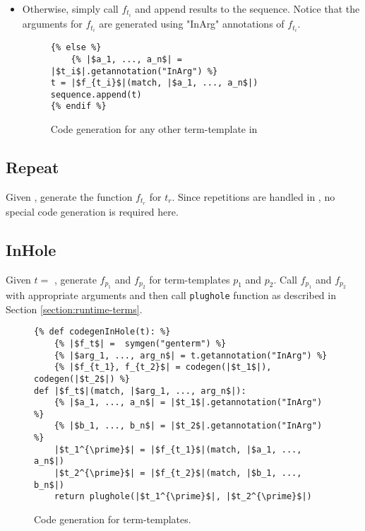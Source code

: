 \begin{itemize}
\item Otherwise, simply call $f_{t_i}$ and append results to the sequence. Notice that the arguments for $f_{t_i}$ are generated using "InArg" annotations of $f_{t_i}$.

\begin{figure}
\begin{verbatim}
{% else %}
	{% |$a_1, ..., a_n$| = |$t_i$|.getannotation("InArg") %}
t = |$f_{t_i}$|(match, |$a_1, ..., a_n$|)
sequence.append(t)
{% endif %}
\end{verbatim}
\caption{Code generation for any other term-template in \TermSequenceNoArg}
\label{codegen-term-sequence-anyother}
\end{figure}
\end{itemize}

\subsection{Repeat}
Given \TermRepeat, generate the function $f_{t_r}$ for $t_r$. Since repetitions are handled in \TermSequenceNoArg, no special code generation is required here.

\subsection{InHole}
Given $t=$ \TermInHole, generate $f_{p_1}$ and $f_{p_2}$ for term-templates $p_1$ and $p_2$. Call $f_{p_1}$ and $f_{p_2}$ with appropriate arguments and then call \texttt{plughole} function as described in Section \ref{section:runtime-terms}.

\begin{figure}
\begin{verbatim}
{% def codegenInHole(t): %}
	{% |$f_t$| =  symgen("genterm") %}
	{% |$arg_1, ..., arg_n$| = t.getannotation("InArg") %}
	{% |$f_{t_1}, f_{t_2}$| = codegen(|$t_1$|), codegen(|$t_2$|) %}
def |$f_t$|(match, |$arg_1, ..., arg_n$|):
	{% |$a_1, ..., a_n$| = |$t_1$|.getannotation("InArg") %}
	{% |$b_1, ..., b_n$| = |$t_2$|.getannotation("InArg") %}
	|$t_1^{\prime}$| = |$f_{t_1}$|(match, |$a_1, ..., a_n$|)
	|$t_2^{\prime}$| = |$f_{t_2}$|(match, |$b_1, ..., b_n$|)
	return plughole(|$t_1^{\prime}$|, |$t_2^{\prime}$|)
\end{verbatim}
\caption{Code generation for \PatternInHoleNoArg \space term-templates.}
\label{codegen-term-inhole}
\end{figure}


